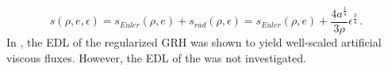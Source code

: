 \documentclass[times,doublespace]{fldauth}%
\begin{document}
%
%
\begin{equation}
\label{eq:ent_equ}
s( \rho, e, \epsilon) = s_{Euler}(\rho, e) + s_{rad}(\rho, \epsilon) = s_{Euler}(\rho, e)+ \frac{4a^{\tfrac{1}{4}}}{3\rho} \epsilon^{\tfrac{3}{4}} \, .
\end{equation}
%
In \cite{our_jcp_radhy_paper}, the EDL of the regularized GRH was shown to yield well-scaled artificial viscous fluxes. However, the EDL of the  was not investigated.
%
%
\end{document}

